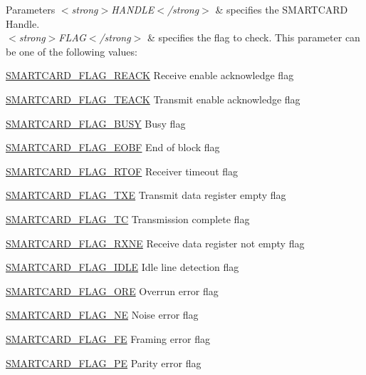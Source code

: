 \begin{DoxyParams}{Parameters}
{\em $<$strong$>$\+H\+A\+N\+D\+L\+E$<$/strong$>$} & specifies the S\+M\+A\+R\+T\+C\+A\+RD Handle. \\
\hline
{\em $<$strong$>$\+F\+L\+A\+G$<$/strong$>$} & specifies the flag to check. This parameter can be one of the following values\+: \begin{DoxyItemize}
\item \hyperlink{group___s_m_a_r_t_c_a_r_d___flags_gabb3eb671a5452cce3359b04cd6ed0f28}{S\+M\+A\+R\+T\+C\+A\+R\+D\+\_\+\+F\+L\+A\+G\+\_\+\+R\+E\+A\+CK} Receive enable acknowledge flag \item \hyperlink{group___s_m_a_r_t_c_a_r_d___flags_ga7f6964385a9b7f2e3f69c8beabd66da9}{S\+M\+A\+R\+T\+C\+A\+R\+D\+\_\+\+F\+L\+A\+G\+\_\+\+T\+E\+A\+CK} Transmit enable acknowledge flag \item \hyperlink{group___s_m_a_r_t_c_a_r_d___flags_ga83d6ea48b1b2efda916d8a29acdd388b}{S\+M\+A\+R\+T\+C\+A\+R\+D\+\_\+\+F\+L\+A\+G\+\_\+\+B\+U\+SY} Busy flag \item \hyperlink{group___s_m_a_r_t_c_a_r_d___flags_ga84a738c8b03a673350e438d577e84179}{S\+M\+A\+R\+T\+C\+A\+R\+D\+\_\+\+F\+L\+A\+G\+\_\+\+E\+O\+BF} End of block flag \item \hyperlink{group___s_m_a_r_t_c_a_r_d___flags_gac05fb1d4e23907a7fbedea32b2b4f301}{S\+M\+A\+R\+T\+C\+A\+R\+D\+\_\+\+F\+L\+A\+G\+\_\+\+R\+T\+OF} Receiver timeout flag \item \hyperlink{group___s_m_a_r_t_c_a_r_d___flags_ga5ac591d03dcadd10c53f6d586a0e485c}{S\+M\+A\+R\+T\+C\+A\+R\+D\+\_\+\+F\+L\+A\+G\+\_\+\+T\+XE} Transmit data register empty flag \item \hyperlink{group___s_m_a_r_t_c_a_r_d___flags_ga778899c7c536fcbbcf3d6cc00b4139fb}{S\+M\+A\+R\+T\+C\+A\+R\+D\+\_\+\+F\+L\+A\+G\+\_\+\+TC} Transmission complete flag \item \hyperlink{group___s_m_a_r_t_c_a_r_d___flags_ga1f617725b179572983789cbc7da1a955}{S\+M\+A\+R\+T\+C\+A\+R\+D\+\_\+\+F\+L\+A\+G\+\_\+\+R\+X\+NE} Receive data register not empty flag \item \hyperlink{group___s_m_a_r_t_c_a_r_d___flags_ga5576e74148257291b05dcc410f501e8a}{S\+M\+A\+R\+T\+C\+A\+R\+D\+\_\+\+F\+L\+A\+G\+\_\+\+I\+D\+LE} Idle line detection flag \item \hyperlink{group___s_m_a_r_t_c_a_r_d___flags_ga48dfe32b52249f43c0e4396a29c07a85}{S\+M\+A\+R\+T\+C\+A\+R\+D\+\_\+\+F\+L\+A\+G\+\_\+\+O\+RE} Overrun error flag \item \hyperlink{group___s_m_a_r_t_c_a_r_d___flags_ga14a7b77b47b2e83a4cf4ef6f8e8ee23b}{S\+M\+A\+R\+T\+C\+A\+R\+D\+\_\+\+F\+L\+A\+G\+\_\+\+NE} Noise error flag \item \hyperlink{group___s_m_a_r_t_c_a_r_d___flags_gaa85318d22a73dbbf1498363545999bf3}{S\+M\+A\+R\+T\+C\+A\+R\+D\+\_\+\+F\+L\+A\+G\+\_\+\+FE} Framing error flag \item \hyperlink{group___s_m_a_r_t_c_a_r_d___flags_ga19dfcc02f14bb270f559601cca5f433d}{S\+M\+A\+R\+T\+C\+A\+R\+D\+\_\+\+F\+L\+A\+G\+\_\+\+PE} Parity error flag \end{DoxyItemize}
\\
\hline
\end{DoxyParams}

